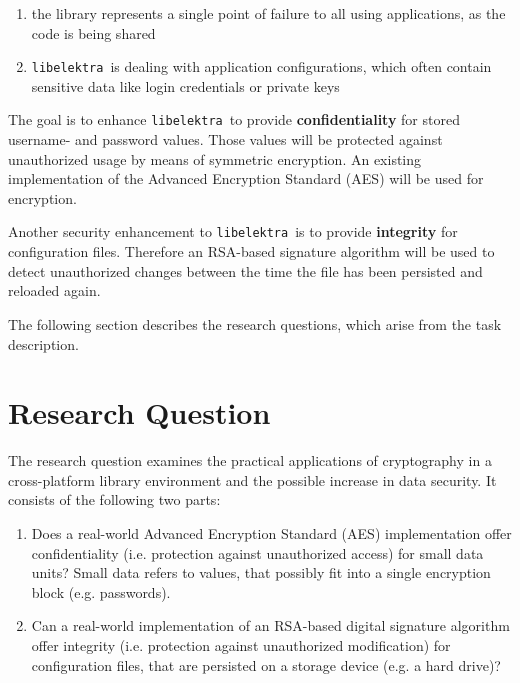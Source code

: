 \documentclass[a4paper,12pt]{article}
\newcommand{\libelektra}{\texttt{libelektra}~}
\begin{document}
\begin{enumerate}
\item the library represents a single point of failure to all using applications, as the code is being shared
\item \libelektra is dealing with application configurations, which often contain sensitive data like login credentials or private keys
\end{enumerate}

The goal is to enhance \libelektra to provide \textbf{confidentiality} for stored username- and password values.
Those values will be protected against unauthorized usage by means of symmetric encryption.
An existing implementation of the Advanced Encryption Standard (AES) will be used for encryption.

Another security enhancement to \libelektra is to provide \textbf{integrity} for configuration files.
Therefore an RSA-based signature algorithm will be used to detect unauthorized changes between the time the file has been persisted and reloaded again.

The following section describes the research questions, which arise from the task description.


\section{Research Question}

The research question examines the practical applications of cryptography in a cross-platform library environment and the possible increase in data security.
It consists of the following two parts:

\begin{enumerate}
\item Does a real-world Advanced Encryption Standard (AES) implementation offer confidentiality (i.e. protection against unauthorized access) for small data units?
Small data refers to values, that possibly fit into a single encryption block (e.g. passwords).
\item Can a real-world implementation of an RSA-based digital signature algorithm offer integrity (i.e. protection against unauthorized modification) for configuration files, that are persisted on a storage device (e.g. a hard drive)?
\end{enumerate}
\end{document}
